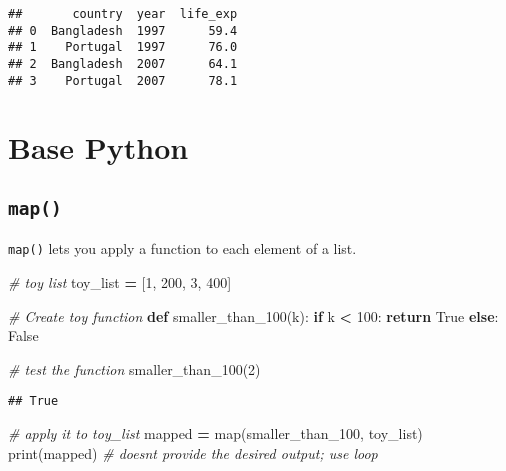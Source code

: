 \documentclass[
]{book}
\newenvironment{Shaded}{\begin{snugshade}}{\end{snugshade}}
\newcommand{\BuiltInTok}[1]{#1}
\newcommand{\CommentTok}[1]{\textcolor[rgb]{0.56,0.35,0.01}{\textit{#1}}}
\newcommand{\ControlFlowTok}[1]{\textcolor[rgb]{0.13,0.29,0.53}{\textbf{#1}}}
\newcommand{\DecValTok}[1]{\textcolor[rgb]{0.00,0.00,0.81}{#1}}
\newcommand{\KeywordTok}[1]{\textcolor[rgb]{0.13,0.29,0.53}{\textbf{#1}}}
\newcommand{\NormalTok}[1]{#1}
\newcommand{\OperatorTok}[1]{\textcolor[rgb]{0.81,0.36,0.00}{\textbf{#1}}}
\newcommand{\VariableTok}[1]{\textcolor[rgb]{0.00,0.00,0.00}{#1}}
\begin{document}
\begin{verbatim}
##       country  year  life_exp
## 0  Bangladesh  1997      59.4
## 1    Portugal  1997      76.0
## 2  Bangladesh  2007      64.1
## 3    Portugal  2007      78.1
\end{verbatim}

\hypertarget{base-python}{%
\chapter{Base Python}\label{base-python}}

\hypertarget{map}{%
\section{\texorpdfstring{\texttt{map()}}{map()}}\label{map}}

\texttt{map()} lets you apply a function to each element of a list.

\begin{Shaded}
\begin{Highlighting}[]
\CommentTok{\# toy list}
\NormalTok{toy\_list }\OperatorTok{=}\NormalTok{ [}\DecValTok{1}\NormalTok{, }\DecValTok{200}\NormalTok{, }\DecValTok{3}\NormalTok{, }\DecValTok{400}\NormalTok{]}

\CommentTok{\# Create toy function}
\KeywordTok{def}\NormalTok{ smaller\_than\_100(k):}
  \ControlFlowTok{if}\NormalTok{ k }\OperatorTok{\textless{}} \DecValTok{100}\NormalTok{:}
    \ControlFlowTok{return} \VariableTok{True}
  \ControlFlowTok{else}\NormalTok{:}
    \VariableTok{False}
\end{Highlighting}
\end{Shaded}

\begin{Shaded}
\begin{Highlighting}[]
\CommentTok{\# test the function}
\NormalTok{smaller\_than\_100(}\DecValTok{2}\NormalTok{)}
\end{Highlighting}
\end{Shaded}

\begin{verbatim}
## True
\end{verbatim}

\begin{Shaded}
\begin{Highlighting}[]
\CommentTok{\# apply it to toy\_list}
\NormalTok{mapped }\OperatorTok{=} \BuiltInTok{map}\NormalTok{(smaller\_than\_100, toy\_list)}
\BuiltInTok{print}\NormalTok{(mapped) }\CommentTok{\# doesn\textquotesingle{}t provide the desired output; use loop}
\end{Highlighting}
\end{Shaded}
\end{document}

